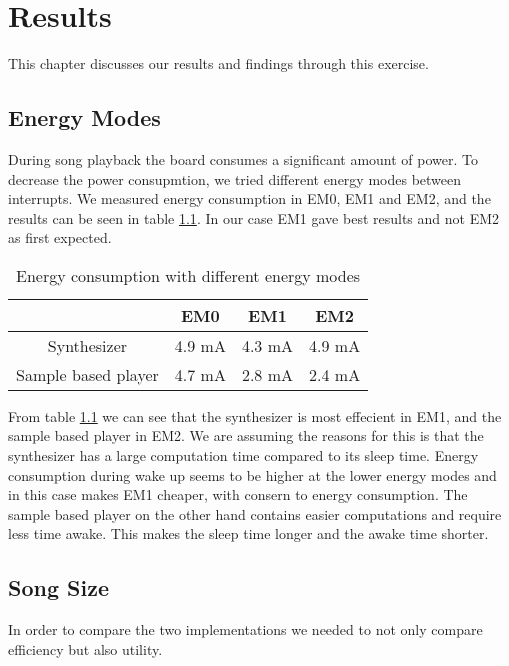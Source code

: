 \chapter{Results}

This chapter discusses our results and findings through this exercise.


\section{Energy Modes}
\label{sec:energyModeResults}
During song playback the board consumes a significant amount of power. To decrease the power consupmtion, we tried different energy modes between interrupts. We measured energy consumption in EM0, EM1 and EM2, and the results can be seen in table \ref{tab:benchmarkEnergyModes}. In our case EM1 gave best results and not EM2 as first expected.

\begin{table}[H]
	\begin{center}
	\begin{tabular}{ |c|c|c|c| }
	  \hline
	  & EM0 & EM1 & EM2 \\
	  \hline
	  Synthesizer & 4.9 mA & 4.3 mA & 4.9 mA \\
	  \hline
	  Sample based player & 4.7 mA & 2.8 mA & 2.4 mA \\
	  \hline

	\end{tabular}
	\caption{Energy consumption with different energy modes}
	\label{tab:benchmarkEnergyModes}
	\end{center}
\end{table}

From table \ref{tab:benchmarkEnergyModes} we can see that the synthesizer is most effecient in EM1, and the sample based player in EM2. We are assuming the reasons for this is that the synthesizer has a large computation time compared to its sleep time. Energy consumption during wake up seems to be higher at the lower energy modes and in this case makes EM1 cheaper, with consern to energy consumption. The sample based player on the other hand contains easier computations and require less time awake. This makes the sleep time longer and the awake time shorter. 

\section{Song Size}
In order to compare the two implementations we needed to not only compare efficiency but also utility. 


